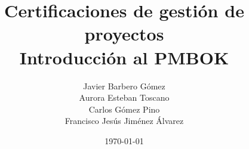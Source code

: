 \documentclass{beamer}
\title[Certificaciones de gestión de proyectos]{Certificaciones de gestión de proyectos \\ Introducción al PMBOK} %
\author[]{Javier Barbero Gómez \\ Aurora Esteban Toscano \\ Carlos Gómez Pino \\ Francisco Jesús Jiménez Álvarez} %
\institute[Universidad de Córdoba] %
{
	Universidad de Córdoba \\ %
	Grado en Ingeniería Informática \\
	Proyectos
	\medskip
}
\date{\today} %
\begin{document}
	
	\titlepage %
	
	\begin{frame}
		\tableofcontents
	\end{frame}
	
	
	
	
	
	
	\titlepage
	
\end{document}
